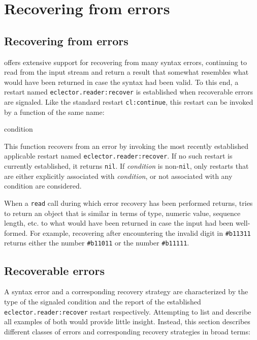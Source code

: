 \chapter{Recovering from errors}

\section{Recovering from errors}
\label{sec:recovering-from-errors}

\sysname{} offers extensive support for recovering from many syntax
errors, continuing to read from the input stream and return a result
that somewhat resembles what would have been returned in case the
syntax had been valid.  To this end, a restart named
\texttt{eclector.reader:recover} is established when recoverable
errors are signaled.  Like the standard \commonlisp{} restart
\texttt{cl:continue}, this restart can be invoked by a function of the
same name:

 {\optional condition}

This function recovers from an error by invoking the most recently
established applicable restart named \texttt{eclector.reader:recover}.
If no such restart is currently established, it returns \texttt{nil}.
If \textit{condition} is non-\texttt{nil}, only restarts that are
either explicitly associated with \textit{condition}, or not
associated with any condition are considered.

When a \texttt{read} call during which error recovery has been
performed returns, \sysname{} tries to return an object that is
similar in terms of type, numeric value, sequence length, etc. to what
would have been returned in case the input had been well-formed.  For
example, recovering after encountering the invalid digit in
\texttt{\#b11311} returns either the number \texttt{\#b11011} or the
number \texttt{\#b11111}.

\section{Recoverable errors}
\label{sec:recoverable-errors}

A syntax error and a corresponding recovery strategy are characterized
by the type of the signaled condition and the report of the
established \texttt{eclector.reader:recover} restart respectively.
Attempting to list and describe all examples of both would provide
little insight.  Instead, this section describes different classes of
errors and corresponding recovery strategies in broad terms:

